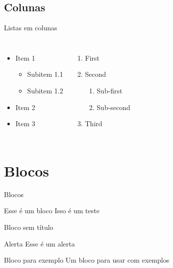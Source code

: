 \documentclass{beamer}
\begin{document}
\subsection{Colunas}

\begin{frame}{Listas em colunas}
    \begin{columns}[t, onlytextwidth]
            \begin{itemize}
                \item Item 1
                \begin{itemize}
                    \item Subitem 1.1
                    \item Subitem 1.2
                \end{itemize}
                \item Item 2
                \item Item 3
            \end{itemize}
        
            \begin{enumerate}
                \item First
                \item Second
                \begin{enumerate}
                    \item Sub-first
                    \item Sub-second
                \end{enumerate}
                \item Third
            \end{enumerate}
    \end{columns}
\end{frame}


\section{Blocos}


\begin{frame}{Blocos}
    \begin{block}{Esse é um bloco}
        Isso é um teste
    \end{block}
    \begin{block}{}
    Bloco sem título	
    \end{block}
    \begin{alertblock}{Alerta}
        Esse é um alerta
    \end{alertblock}
    \begin{exampleblock}{Bloco para exemplo}
           Um bloco para usar com exemplos
        \end{exampleblock}
\end{frame}
\end{document}
